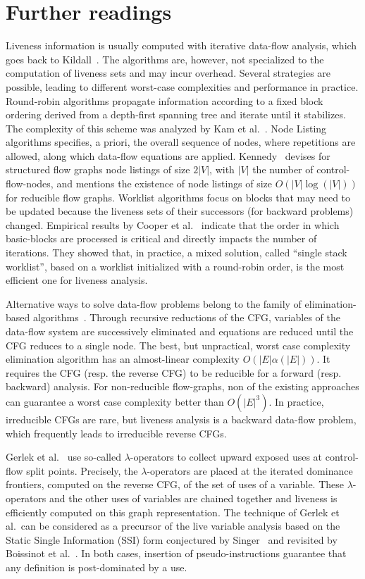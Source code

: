 \section{Further readings}
\label{sec:liveness:further}
Liveness information is usually computed with iterative
data-flow analysis, which goes back to Kildall~\cite{Kildall}. The algorithms are,
however, not specialized to the computation of liveness sets and may
incur overhead. Several strategies are possible, leading to
different worst-case complexities and performance in practice. Round-robin algorithms
propagate information according to a fixed block ordering derived from a
depth-first spanning tree and iterate until it stabilizes.  The complexity of
this scheme was analyzed by Kam et al.~\cite{novillo:bib:KU76}.  
Node Listing algorithms specifies, a priori, the overall sequence of nodes, where repetitions are allowed, along which data-flow equations are applied. Kennedy~\cite{Kennedy75} devises for structured flow graphs node listings of size $2|V|$, with $|V|$ the number of control-flow-nodes, and mentions the existence of node listings of size $O\left(|V| \log(|V|)\right)$ for reducible flow graphs.
Worklist algorithms focus on blocks that may need
to be updated because the liveness sets of their successors (for
backward problems) changed.
Empirical results by Cooper et al.~\cite{CHK06} indicate that the order in
which basic-blocks are processed is critical and directly impacts the number of
iterations. They showed that, in practice, a mixed solution, called ``single
stack worklist'', based on a worklist initialized with a round-robin order, is
the most efficient one  for liveness analysis. 

Alternative ways to solve data-flow problems belong to the family of elimina\-tion-based algorithms~\cite{RyPa86b}. Through recursive reductions of the 
CFG, variables of the data-flow system are successively eliminated and equations are reduced until the CFG reduces to a single node. 
The best, but unpractical, worst case complexity elimination algorithm has an almost-linear complexity $O(|E|\alpha(|E|))$. 
It requires the CFG (resp. the reverse CFG) to be reducible for a forward (resp.  backward) analysis.
For non-reducible flow-graphs, non of the existing approa\-ches can guarantee a worst case complexity better than $O(|E|^3)$.
In practice, irreducible CFGs are rare, but liveness
analysis is a backward data-flow problem, which frequently leads to
irreducible reverse CFGs. 

Gerlek et al.~\cite{gerlek94reference} use so-called $\lambda$-operators to collect upward exposed uses at control-flow split points.
Precisely, the $\lambda$-operators are placed at the iterated dominance frontiers, computed on the reverse CFG, of the set of uses of a variable.
These $\lambda$-operators and the other uses of variables are chained together and liveness is efficiently computed on this graph representation.
The technique of Gerlek et al.~can be considered as a precursor of the live variable analysis based on the Static Single Information (SSI) form conjectured by Singer~\cite{novillo:bib:S05} and revisited by Boissinot et al.~\cite{BoissinotBDR12}.
In both cases, insertion of pseudo-instructions guarantee that any definition is post-dominated by a use.

